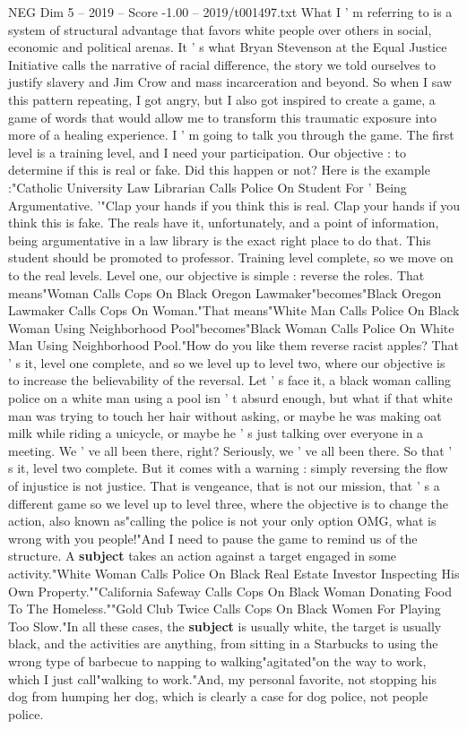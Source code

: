 \begin{textsample}{NEG Dim 5 – 2019 – Score -1.00 – 2019/t001497.txt}
What I ' m referring to is a system of structural advantage that favors white people over others in social, economic and political arenas.
It ' s what Bryan Stevenson at the Equal Justice Initiative calls the narrative of racial difference, the story we told ourselves to justify slavery and Jim Crow and mass incarceration and beyond.
So when I saw this pattern repeating, I got angry, but I also got inspired to create a game, a game of words that would allow me to transform this traumatic exposure into more of a healing experience.
I ' m going to talk you through the game.
The first level is a training level, and I need your participation.
Our objective : to determine if this is real or fake.
Did this happen or not?
Here is the example :"Catholic University Law Librarian Calls Police On Student For ' Being Argumentative. '"Clap your hands if you think this is real.
Clap your hands if you think this is fake.
The reals have it, unfortunately, and a point of information, being argumentative in a law library is the exact right place to do that.
This student should be promoted to professor.
Training level complete, so we move on to the real levels.
Level one, our objective is simple : reverse the roles.
That means"Woman Calls Cops On Black Oregon Lawmaker"becomes"Black Oregon Lawmaker Calls Cops On Woman."That means"White Man Calls Police On Black Woman Using Neighborhood Pool"becomes"Black Woman Calls Police On White Man Using Neighborhood Pool."How do you like them reverse racist apples?
That ' s it, level one complete, and so we level up to level two, where our objective is to increase the believability of the reversal.
Let ' s face it, a black woman calling police on a white man using a pool isn ' t absurd enough, but what if that white man was trying to touch her hair without asking, or maybe he was making oat milk while riding a unicycle, or maybe he ' s just talking over everyone in a meeting.
We ' ve all been there, right?
Seriously, we ' ve all been there.
So that ' s it, level two complete.
But it comes with a warning : simply reversing the flow of injustice is not justice.
That is vengeance, that is not our mission, that ' s a different game so we level up to level three, where the objective is to change the action, also known as"calling the police is not your only option OMG, what is wrong with you people!"And I need to pause the game to remind us of the structure.
A \textbf{subject} takes an action against a target engaged in some activity."White Woman Calls Police On Black Real Estate Investor Inspecting His Own Property.""California Safeway Calls Cops On Black Woman Donating Food To The Homeless.""Gold Club Twice Calls Cops On Black Women For Playing Too Slow."In all these cases, the \textbf{subject} is usually white, the target is usually black, and the activities are anything, from sitting in a Starbucks to using the wrong type of barbecue to napping to walking"agitated"on the way to work, which I just call"walking to work."And, my personal favorite, not stopping his dog from humping her dog, which is clearly a case for dog police, not people police.

\end{textsample}
